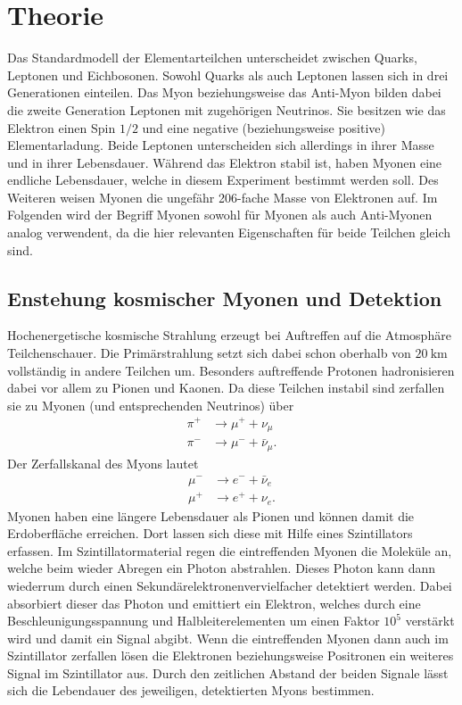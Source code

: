 \section{Theorie}
Das Standardmodell der Elementarteilchen unterscheidet zwischen Quarks, Leptonen und Eichbosonen.
Sowohl Quarks als auch Leptonen lassen sich in drei Generationen einteilen.
Das Myon beziehungsweise das Anti-Myon
bilden dabei die zweite Generation Leptonen mit zugehörigen Neutrinos. Sie besitzen wie das Elektron
einen Spin $1/2$ und eine negative (beziehungsweise positive) Elementarladung. Beide Leptonen unterscheiden sich allerdings in ihrer Masse
und in ihrer Lebensdauer. Während das Elektron stabil ist, haben Myonen eine endliche Lebensdauer, welche in diesem
Experiment bestimmt werden soll. Des Weiteren weisen Myonen die ungefähr 206-fache Masse von Elektronen auf.
Im Folgenden wird der Begriff Myonen sowohl für Myonen als auch Anti-Myonen analog verwendent, da die hier
relevanten Eigenschaften für beide Teilchen gleich sind.

\subsection{Enstehung kosmischer Myonen und Detektion}
Hochenergetische kosmische Strahlung erzeugt bei Auftreffen auf die Atmosphäre Teilchenschauer. Die Primärstrahlung setzt sich dabei schon oberhalb von $\SI{20}{\kilo\metre}$ vollständig in andere Teilchen um\cite{gerthsen2013physik}. Besonders auftreffende Protonen hadronisieren dabei vor allem zu Pionen und Kaonen.
Da diese Teilchen instabil sind zerfallen sie zu Myonen (und entsprechenden Neutrinos) über
\begin{align*}
    \pi^{+} &\to \mu^{+} + \nu_{\mu} \\
    \pi^{-} &\to \mu^{-} + \bar{\nu}_{\mu}.
\end{align*}
Der Zerfallskanal des Myons lautet
\begin{align*}
    \mu^{-} &\to e^{-} + \bar{\nu}_{e} \\
    \mu^{+} &\to e^{+} + \nu_{e}.
\end{align*}
Myonen haben eine längere Lebensdauer als Pionen und können damit die Erdoberfläche erreichen.
Dort lassen sich diese mit Hilfe eines Szintillators erfassen. Im Szintillatormaterial regen die eintreffenden
Myonen die Moleküle an, welche beim wieder Abregen ein Photon abstrahlen. Dieses Photon kann dann wiederrum
durch einen Sekundärelektronenvervielfacher detektiert werden. Dabei absorbiert dieser das Photon und emittiert
ein Elektron, welches durch eine Beschleunigungsspannung und Halbleiterelementen um einen Faktor $10^5$ verstärkt wird
und damit ein Signal abgibt.
Wenn die eintreffenden Myonen dann auch im Szintillator zerfallen lösen die Elektronen beziehungsweise Positronen
ein weiteres Signal im Szintillator aus. Durch den zeitlichen Abstand der beiden Signale lässt sich
die Lebendauer des jeweiligen, detektierten Myons bestimmen.


